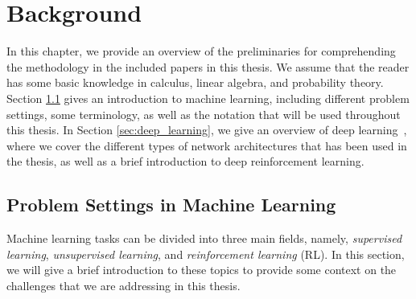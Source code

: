 
\chapter{Background}
\label{chap2}

In this chapter, we provide an overview of the preliminaries for comprehending the methodology in the included papers in this thesis. We assume that the reader has some basic knowledge in calculus, linear algebra, and probability theory. Section \ref{sec:problem_settings_in_ml} gives an introduction to machine learning, including different problem settings, some terminology, as well as the notation that will be used throughout this thesis. In Section \ref{sec:deep_learning}, we give an overview of deep learning~\cite{goodfellow2016deep}, where we cover the different types of network architectures that has been used in the thesis, as well as a brief introduction to deep reinforcement learning. 





\section{Problem Settings in Machine Learning}\label{sec:problem_settings_in_ml}

Machine learning tasks can be divided into three main fields, namely, \textit{supervised learning}, \textit{unsupervised learning}, and \textit{reinforcement learning} (RL). In this section, we will give a brief introduction to these topics to provide some context on the challenges that we are addressing in this thesis. 

